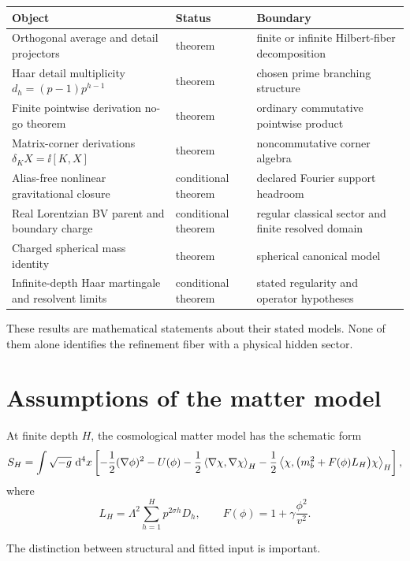 \begin{longtable}{@{}P{0.30\textwidth}P{0.18\textwidth}P{0.44\textwidth}@{}}
\toprule
Object & Status & Boundary\\
\midrule
Orthogonal average and detail projectors & theorem & finite or infinite Hilbert-fiber decomposition\\
Haar detail multiplicity $d_h=(p-1)p^{h-1}$ & theorem & chosen prime branching structure\\
Finite pointwise derivation no-go theorem & theorem & ordinary commutative pointwise product\\
Matrix-corner derivations $\delta_KX=\ii[K,X]$ & theorem & noncommutative corner algebra\\
Alias-free nonlinear gravitational closure & conditional theorem & declared Fourier support headroom\\
Real Lorentzian BV parent and boundary charge & conditional theorem & regular classical sector and finite resolved domain\\
Charged spherical mass identity & theorem & spherical canonical model\\
Infinite-depth Haar martingale and resolvent limits & conditional theorem & stated regularity and operator hypotheses\\
\bottomrule
\end{longtable}

These results are mathematical statements about their stated models.  None of them alone identifies the refinement fiber with a physical hidden sector.

\section{Assumptions of the matter model}

At finite depth $H$, the cosmological matter model has the schematic form
\begin{equation}
S_H=\int\sqrt{-g}\,\,\mathrm d^4x
\left[
-\frac12(\nabla\phi)^2-U(\phi)
-\frac12\left\langle \nabla\chi,\nabla\chi\right\rangle_H
-\frac12\left\langle \chi,\bigl(m_b^2+F(\phi)L_H\bigr)\chi\right\rangle_H
\right],
\label{eq:audit-finite-action}
\end{equation}
where
\begin{equation}
L_H=\Lambda^2\sum_{h=1}^{H}p^{2\sigma h}D_h,
\qquad
F(\phi)=1+\gamma\frac{\phi^2}{v^2}.
\label{eq:audit-fiber-inputs}
\end{equation}

The distinction between structural and fitted input is important.

